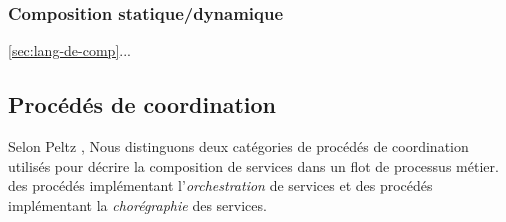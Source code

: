       \subsubsection{Composition statique/dynamique}
      \label{sec:comp-stat}




    \ref{sec:lang-de-comp}...
    \newpage


      \subsection{Procédés de coordination}
      \label{sec:proc-de-coord}

      Selon Peltz \cite{peltz2003web}, Nous distinguons deux
      catégories de procédés de coordination utilisés pour décrire la
      composition de services dans un flot de processus métier. des
      procédés implémentant l'\emph{orchestration} de services et des
      procédés implémentant la \emph{chorégraphie} des services.


